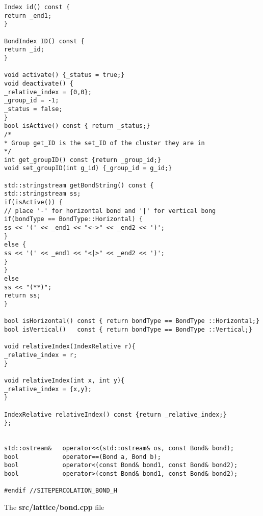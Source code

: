 \begin{lstlisting}[style=CStyle]
Index id() const {
return _end1;
}

BondIndex ID() const {
return _id;
}

void activate() {_status = true;}
void deactivate() {
_relative_index = {0,0};
_group_id = -1;
_status = false;
}
bool isActive() const { return _status;}
/*
* Group get_ID is the set_ID of the cluster they are in
*/
int get_groupID() const {return _group_id;}
void set_groupID(int g_id) {_group_id = g_id;}

std::stringstream getBondString() const {
std::stringstream ss;
if(isActive()) {
// place '-' for horizontal bond and '|' for vertical bong
if(bondType == BondType::Horizontal) {
ss << '(' << _end1 << "<->" << _end2 << ')';
}
else {
ss << '(' << _end1 << "<|>" << _end2 << ')';
}
}
else
ss << "(**)";
return ss;
}

bool isHorizontal() const { return bondType == BondType ::Horizontal;}
bool isVertical()   const { return bondType == BondType ::Vertical;}

void relativeIndex(IndexRelative r){
_relative_index = r;
}

void relativeIndex(int x, int y){
_relative_index = {x,y};
}

IndexRelative relativeIndex() const {return _relative_index;}
};


std::ostream&   operator<<(std::ostream& os, const Bond& bond);
bool            operator==(Bond a, Bond b);
bool            operator<(const Bond& bond1, const Bond& bond2);
bool            operator>(const Bond& bond1, const Bond& bond2);

#endif //SITEPERCOLATION_BOND_H
\end{lstlisting}

The \textbf{src/lattice/bond.cpp} file

